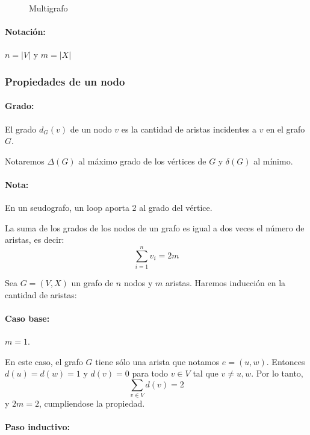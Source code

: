 \begin{figure}[H]
	\begin{center}
	\end{center}		
	\caption{Multigrafo}
\end{figure}

\paragraph{Notación:} \(n = |V|\) y \(m=|X|\)
\subsubsection{Propiedades de un nodo}
\paragraph{Grado:} El grado \(d_G(v)\) de un nodo \(v\) es la cantidad de aristas incidentes a \(v\) en el grafo \(G\). 

Notaremos \(\Delta(G)\) al máximo grado de los vértices de \(G\) y \(\delta(G)\) al mínimo.

\paragraph{Nota:} En un seudografo, un loop aporta 2 al grado del vértice.

\begin{theorem}
La suma de los grados de los nodos de un grafo es igual a dos veces el número de aristas, es decir: \[\sum_{i=1}^{n}v_i = 2m\]
\end{theorem}

\begin{demo}
Sea \(G = (V, X)\) un grafo de \(n\) nodos y \(m\) aristas. Haremos inducción en la cantidad de aristas:

\paragraph{Caso base:} \(m = 1\).

	En este caso, el grafo \(G\) tiene sólo una arista que notamos \(e = (u,w)\). Entonces \(d(u) = d(w) = 1\) y \(d(v) = 0\) para todo \(v\in V\) tal que \(v\neq u,w\). Por lo tanto, \[\sum_{v\in V}d(v) = 2\] y \(2m = 2\), cumpliendose la propiedad.
	
\paragraph{Paso inductivo:}
\end{demo}
\appendix
